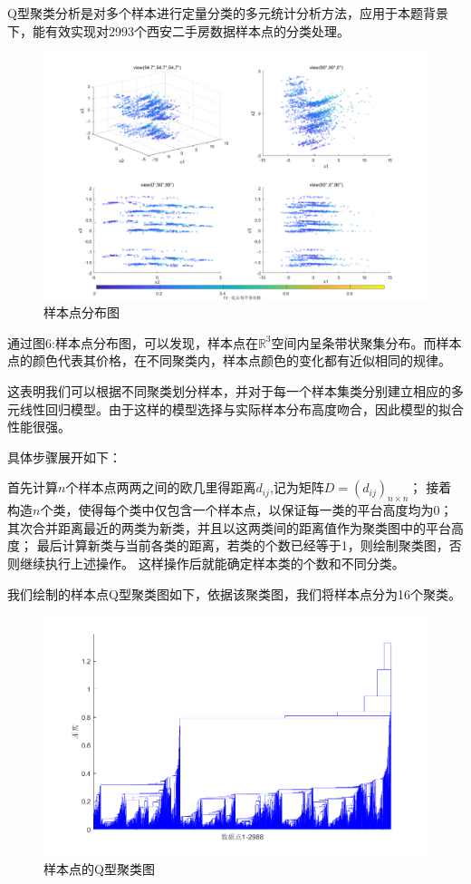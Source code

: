 \documentclass[withoutpreface,bwprint]{cumcmthesis} %
\begin{document}
Q型聚类分析是对多个样本进行定量分类的多元统计分析方法，应用于本题背景下，能有效实现对2993个西安二手房数据样本点的分类处理。
\begin{figure}[H]
    \centering
    \includegraphics[scale=0.35]{不同角度的样本点分布图.png}
    \caption{样本点分布图}
    \label{样本点分布图}
\end{figure}
通过图6:样本点分布图，可以发现，样本点在$\mathbb{R}^3$空间内呈条带状聚集分布。而样本点的颜色代表其价格，在不同聚类内，样本点颜色的变化都有近似相同的规律。

这表明我们可以根据不同聚类划分样本，并对于每一个样本集类分别建立相应的多元线性回归模型。由于这样的模型选择与实际样本分布高度吻合，因此模型的拟合性能很强。



具体步骤展开如下：

   首先计算$n$个样本点两两之间的欧几里得距离$d_{ij}$,记为矩阵$D=(d_{ij})_{n\times n}$；
  接着构造$n$个类，使得每个类中仅包含一个样本点，以保证每一类的平台高度均为0；
    其次合并距离最近的两类为新类，并且以这两类间的距离值作为聚类图中的平台高度；
    最后计算新类与当前各类的距离，若类的个数已经等于1，则绘制聚类图，否则继续执行上述操作。
    这样操作后就能确定样本类的个数和不同分类。

    \newpage
    \vfill
我们绘制的样本点Q型聚类图如下，依据该聚类图，我们将样本点分为16个聚类。
\vfill
\begin{figure}[H]
    \centering
    \includegraphics[scale=0.6]{样本点的Q型聚类图.png}
    \caption{样本点的Q型聚类图}
    \label{fig:样本点的Q型聚类图}
\end{figure}
\end{document}
